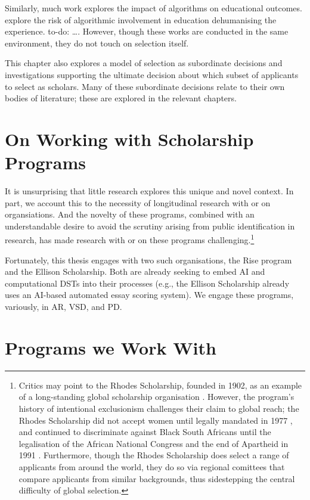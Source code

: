 Similarly, much work explores the impact of algorithms on educational outcomes. \textcite{NISSENBAUM1998237} explore the risk of algorithmic involvement in education dehumanising the experience. to-do: \dots. However, though these works are conducted in the same environment, they do not touch on selection itself.

This chapter also explores a model of selection as subordinate decisions and investigations supporting the ultimate decision about which subset of applicants to select as scholars. Many of these subordinate decisions relate to their own bodies of literature; these are explored in the relevant chapters.

\section{On Working with Scholarship Programs}
It is unsurprising that little research explores this unique and novel context. In part, we account this to the necessity of longitudinal research with or on organsiations. And the novelty of these programs, combined with an understandable desire to avoid the scrutiny arising from public identification in research, has made research with or on these programs challenging.\footnote{Critics may point to the Rhodes Scholarship, founded in 1902, as an example of a long-standing global scholarship organisation \cite{Ziegler_2008}. However, the program's history of intentional exclusionism challenges their claim to global reach; the Rhodes Scholarship did not accept women until legally mandated in 1977 \cite{Ziegler_2008}, and continued to discriminate against Black South Africans until the legalisation of the African National Congress and the end of Apartheid in 1991 \cite{Ziegler_2008}. Furthermore, though the Rhodes Scholarship does select a range of applicants from around the world, they do so via regional comittees that compare applicants from similar backgrounds, thus sidestepping the central difficulty of global selection.}

Fortunately, this thesis engages with two such organisations, the Rise program and the Ellison Scholarship. Both are already seeking to embed AI and computational DSTs into their processes (e.g., the Ellison Scholarship already uses an AI-based automated essay scoring system). We engage these programs, variously, in AR, VSD, and PD. 

\section{Programs we Work With}\label{sec:programs}
